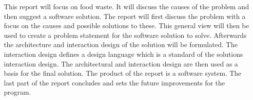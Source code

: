 This report will focus on food waste. It will discuss the causes of the problem and then suggest a software solution. The report will first discuss the problem with a focus on the causes and possible solutions to these. This general view will then be used to create a problem statement for the software solution to solve. Afterwards the architecture and interaction design of the solution will be formulated. The interaction design defines a design language which is a standard of the solutions interaction design. The architectural and interaction design are then used as a basis for the final solution. The product of the report is a software system. The last part of the report concludes and sets the future improvements for the program. 